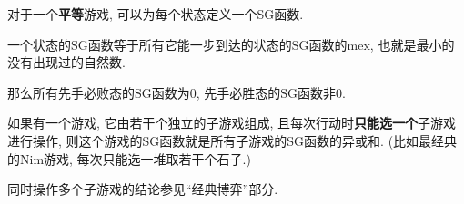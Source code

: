 对于一个\textbf{平等}游戏, 可以为每个状态定义一个SG函数.

一个状态的SG函数等于所有它能一步到达的状态的SG函数的$\text{mex}$, 也就是最小的没有出现过的自然数.

那么所有先手必败态的SG函数为$0$, 先手必胜态的SG函数非$0$.

如果有一个游戏, 它由若干个独立的子游戏组成, 且每次行动时\textbf{只能选一个}子游戏进行操作, 则这个游戏的SG函数就是所有子游戏的SG函数的异或和. (比如最经典的Nim游戏, 每次只能选一堆取若干个石子.)

同时操作多个子游戏的结论参见``经典博弈''部分.